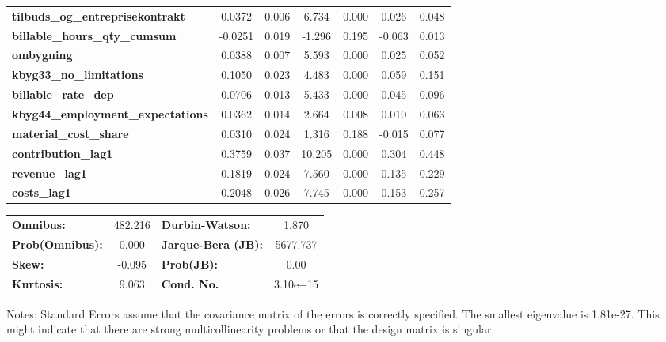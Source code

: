 \begin{center}
\begin{tabular}{lcccccc}
\textbf{tilbuds\_og\_entreprisekontrakt}  &       0.0372  &        0.006     &     6.734  &         0.000        &        0.026    &        0.048     \\
\textbf{billable\_hours\_qty\_cumsum}     &      -0.0251  &        0.019     &    -1.296  &         0.195        &       -0.063    &        0.013     \\
\textbf{ombygning}                        &       0.0388  &        0.007     &     5.593  &         0.000        &        0.025    &        0.052     \\
\textbf{kbyg33\_no\_limitations}          &       0.1050  &        0.023     &     4.483  &         0.000        &        0.059    &        0.151     \\
\textbf{billable\_rate\_dep}              &       0.0706  &        0.013     &     5.433  &         0.000        &        0.045    &        0.096     \\
\textbf{kbyg44\_employment\_expectations} &       0.0362  &        0.014     &     2.664  &         0.008        &        0.010    &        0.063     \\
\textbf{material\_cost\_share}            &       0.0310  &        0.024     &     1.316  &         0.188        &       -0.015    &        0.077     \\
\textbf{contribution\_lag1}               &       0.3759  &        0.037     &    10.205  &         0.000        &        0.304    &        0.448     \\
\textbf{revenue\_lag1}                    &       0.1819  &        0.024     &     7.560  &         0.000        &        0.135    &        0.229     \\
\textbf{costs\_lag1}                      &       0.2048  &        0.026     &     7.745  &         0.000        &        0.153    &        0.257     \\
\bottomrule
\end{tabular}
\begin{tabular}{lclc}
\textbf{Omnibus:}       & 482.216 & \textbf{  Durbin-Watson:     } &    1.870  \\
\textbf{Prob(Omnibus):} &   0.000 & \textbf{  Jarque-Bera (JB):  } & 5677.737  \\
\textbf{Skew:}          &  -0.095 & \textbf{  Prob(JB):          } &     0.00  \\
\textbf{Kurtosis:}      &   9.063 & \textbf{  Cond. No.          } & 3.10e+15  \\
\bottomrule
\end{tabular}
\end{center}

Notes: \newline
 [1] Standard Errors assume that the covariance matrix of the errors is correctly specified. \newline
 [2] The smallest eigenvalue is 1.81e-27. This might indicate that there are \newline
 strong multicollinearity problems or that the design matrix is singular.